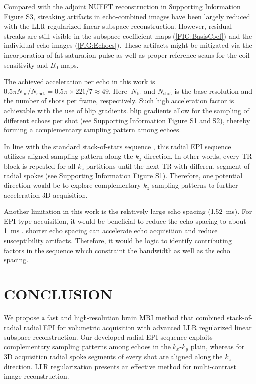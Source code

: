 \documentclass[a4paper,11pt]{article}
\begin{document}
Compared with the adjoint NUFFT reconstruction in Supporting Information Figure S3,
streaking artifacts in echo-combined images have been
largely reduced with the LLR regularized linear subspace reconstruction.
However, residual streaks are still visible in
the subspace coefficient maps (\cref{FIG:BasisCoef})
and the individual echo images (\cref{FIG:Echoes}).
These artifacts might be mitigated via the incorporation of
fat saturation pulse as well as proper reference scans
for the coil sensitivity and $B_0$ maps.

The achieved acceleration per echo in this work
is $0.5 \pi N_{\text{br}} / N_\text{shot} = 0.5\pi \times 220 / 7 \approx 49$.
Here, $N_\text{br}$ and $N_\text{shot}$ is the base resolution and
the number of shots per frame, respectively.
Such high acceleration factor is achievable with the use of blip gradients.
blip gradients allow for the sampling of different echoes per shot
(see Supporting Information Figure S1 and S2),
thereby forming a complementary sampling pattern among echoes.

In line with the standard stack-of-stars sequence \cite{block_2014_rad},
this radial EPI sequence utilizes aligned sampling pattern along the $k_z$ direction.
In other words, every TR block is repeated for all $k_z$ partitions
until the next TR with different segment of radial spokes
(see Supporting Information Figure S1).
Therefore, one potential direction would be
to explore complementary $k_z$ sampling patterns
to further acceleration 3D acquisition.

Another limitation in this work is the relatively large echo spacing (\SI{1.52}{\ms}).
For EPI-type acquisition, it would be beneficial to reduce the echo spacing to about
\SI{1}{\ms} \cite{dong_2020_epti_sub}.
shorter echo spacing can accelerate echo acquisition and reduce
susceptibility artifacts. Therefore, it would be logic to identify
contributing factors in the sequence which constraint the bandwidth
as well as the echo spacing.


\section{CONCLUSION}

We propose a fast and high-resolution brain MRI method that
combined stack-of-radial radial EPI for volumetric acquisition
with advanced LLR regularized linear subspace reconstruction.
Our developed radial EPI sequence exploits complementary sampling
patterns among echoes in the $k_x$-$k_y$ plain,
whereas for 3D acquisition radial spoke segments of every shot are
aligned along the $k_z$ direction.
LLR regularization presents an effective method for multi-contrast
image reconstruction.
\end{document}
